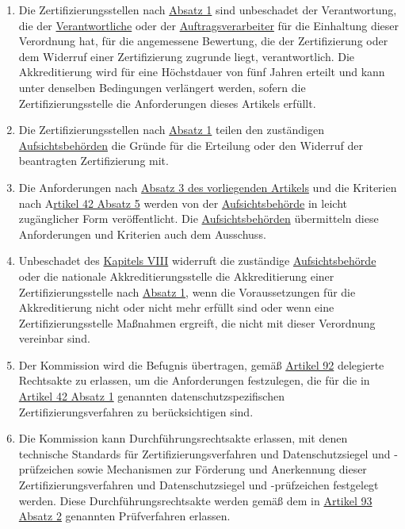 \begin{enumerate}
  \item Die Zertifizierungsstellen nach \hyperref[itm:43-1]{Absatz 1} sind unbeschadet der Verantwortung, die der
   \hyperref[itm:04-7]{Verantwortliche} oder der \hyperref[itm:04-8]{Auftragsverarbeiter} für die Einhaltung dieser
    Verordnung hat, für die angemessene Bewertung, die der Zertifizierung oder dem Widerruf einer Zertifizierung
    zugrunde liegt, verantwortlich. Die Akkreditierung wird für eine Höchstdauer von fünf Jahren erteilt und kann unter
    denselben Bedingungen verlängert werden, sofern die Zertifizierungsstelle die Anforderungen dieses Artikels
    erfüllt.%
  \label{itm:43-4}

  \item Die Zertifizierungsstellen nach \hyperref[itm:43-1]{Absatz 1} teilen den zuständigen \hyperref[itm:04-21]
   {Aufsichtsbehörden} die Gründe für die Erteilung oder den Widerruf der beantragten Zertifizierung mit.%
  \label{itm:43-5}

  \item Die Anforderungen nach \hyperref[itm:43-3]{Absatz 3 des vorliegenden Artikels} und die Kriterien nach A\hyperref
   [itm:42-5]{rtikel 42 Absatz 5} werden von der \hyperref[itm:04-21]{Aufsichtsbehörde} in leicht zugänglicher Form
   veröffentlicht. Die
   \hyperref[itm:04-21]{Aufsichtsbehörden} übermitteln diese Anforderungen und Kriterien auch dem Ausschuss. %
  \label{itm:43-6}

  \item Unbeschadet des \hyperref[part:8]{Kapitels VIII} widerruft die zuständige \hyperref[itm:04-21]
   {Aufsichtsbehörde} oder die nationale Akkreditierungsstelle die Akkreditierung einer Zertifizierungsstelle
   nach \hyperref[itm:43-1]{Absatz 1}, wenn die Voraussetzungen für die Akkreditierung nicht oder nicht mehr erfüllt
   sind oder wenn eine Zertifizierungsstelle Maßnahmen ergreift, die nicht mit dieser Verordnung vereinbar sind.%
  \label{itm:43-7}

  \item Der Kommission wird die Befugnis übertragen, gemäß \hyperref[ch:92]{Artikel 92} delegierte Rechtsakte zu
   erlassen, um die Anforderungen festzulegen, die für die in \hyperref[itm:42-1]{Artikel 42 Absatz 1} genannten
   datenschutzspezifischen Zertifizierungsverfahren zu berücksichtigen sind.%
  \label{itm:43-8}

  \item Die Kommission kann Durchführungsrechtsakte erlassen, mit denen technische Standards für
   Zertifizierungsverfahren und Datenschutzsiegel und -prüfzeichen sowie Mechanismen zur Förderung und Anerkennung
   dieser Zertifizierungsverfahren und Datenschutzsiegel und -prüfzeichen festgelegt werden. Diese
   Durchführungsrechtsakte werden gemäß dem in \hyperref[itm:93-2]{Artikel 93 Absatz 2} genannten Prüfverfahren
   erlassen.%
  \label{itm:43-9}

\end{enumerate}



